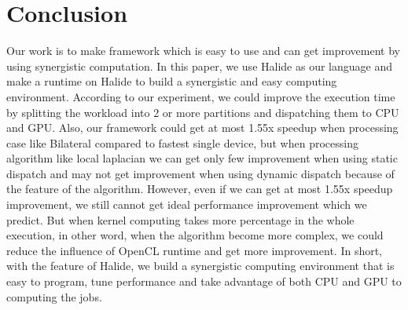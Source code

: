 \chapter{Conclusion}
Our work is to make framework which is easy to use and can get improvement by using synergistic computation. In this paper, we use Halide as our language and make a runtime on Halide to build a synergistic and easy computing environment. 
According to our experiment, we could improve the execution time by splitting the workload into 2 or more partitions and dispatching them to CPU and GPU.  Also, our framework could get at most 1.55x speedup when processing case like Bilateral compared to fastest single device, but when processing algorithm like local laplacian we can get only few improvement when using static dispatch and may not get improvement when using dynamic dispatch because of the feature of the algorithm. However, even if we can get at most 1.55x speedup improvement, we still cannot get ideal performance improvement which we predict. But when kernel computing takes more percentage in the whole execution, in other word, when the algorithm become more complex, we could reduce the influence of OpenCL runtime and get more improvement.
In short, with the feature of Halide, we build a synergistic computing environment that is easy to program, tune performance and take advantage of both CPU and GPU to computing the jobs.
